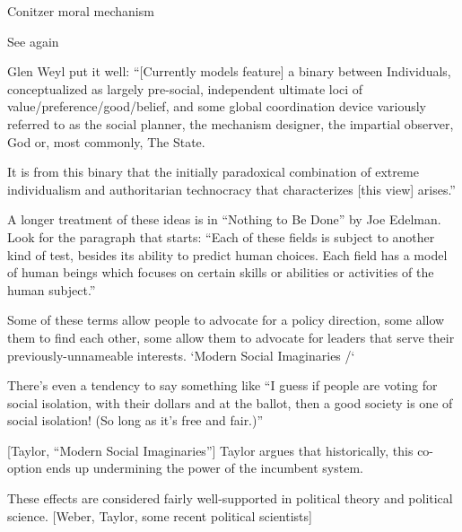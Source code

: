 \begin{thebibliography}{99}
 Conitzer moral mechanism

 See \cite{klingefjord2024} again

 Glen Weyl put it well:
``[Currently models feature] a binary between Individuals, conceptualized as largely pre-social, independent ultimate loci of value/preference/good/belief, and some global coordination device variously referred to as the social planner, the mechanism designer, the impartial observer, God or, most commonly, The State.

It is from this binary that the initially paradoxical combination of extreme individualism and authoritarian technocracy that characterizes [this view] arises.''

 A longer treatment of these ideas is in ``Nothing to Be Done'' by Joe Edelman. Look for the paragraph that starts:
``Each of these fields is subject to another kind of test, besides its ability to predict human choices. Each field has a model of human beings which focuses on certain skills or abilities or activities of the human subject.''

 Some of these terms allow people to advocate for a policy direction, some allow them to find each other, some allow them to advocate for leaders that serve their previously-unnameable interests. `Modern Social Imaginaries /`

 There's even a tendency to say something like ``I guess if people are voting for social isolation, with their dollars and at the ballot, then a good society is one of social isolation! (So long as it's free and fair.)''

 [Taylor, ``Modern Social Imaginaries''] Taylor argues that historically, this co-option ends up undermining the power of the incumbent system.

 These effects are considered fairly well-supported in political theory and political science. [Weber, Taylor, some recent political scientists]

\end{thebibliography}

